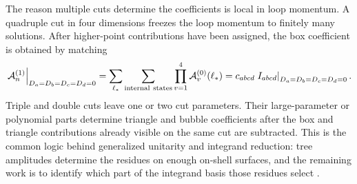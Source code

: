 The reason multiple cuts determine the coefficients is local in loop momentum.
A quadruple cut in four dimensions freezes the loop momentum to finitely many
solutions.  After higher-point contributions have been assigned, the box
coefficient is obtained by matching
\begin{equation}
  \left.\mathcal A_n^{(1)}\right|_{D_a=D_b=D_c=D_d=0}
  =
  \sum_{\ell_*}
  \sum_{\rm internal\ states}
  \prod_{v=1}^4
  \mathcal A^{(0)}_v(\ell_*)
  =
  c_{abcd}
  \left.I_{abcd}\right|_{D_a=D_b=D_c=D_d=0}.
  \label{eq:quadruple-cut-box-coefficient}
\end{equation}
Triple and double cuts leave one or two cut parameters.  Their large-parameter
or polynomial parts determine triangle and bubble coefficients after the box
and triangle contributions already visible on the same cut are subtracted.
This is the common logic behind generalized unitarity and integrand reduction:
tree amplitudes determine the residues on enough on-shell surfaces, and the
remaining work is to identify which part of the integrand basis those residues
select \cite{BDDK1994Unitarity,BDK1996OneLoopQCD,
BrittoCachazoFeng2005GeneralizedUnitarity,OPP2007IntegrandReduction,
Forde2007OneLoopCoefficients}.

